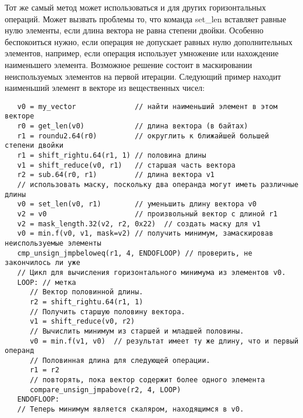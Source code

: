 \documentclass[forwardcom.tex]{subfiles}
\begin{document}
Тот же самый метод может использоваться и для других горизонтальных операций. Может вызвать проблемы то, что команда set\_len вставляет равные нулю элементы, если длина вектора не равна степени двойки. Особенно беспокоиться нужно, если операция не допускает равных нулю дополнительных элементов, например, если операция использует умножение или нахождение наименьшего элемента. Возможное решение состоит в маскировании неиспользуемых элементов на первой итерации. Следующий пример находит наименьший элемент в векторе из вещественных чисел:
\begin{verbatim}
   v0 = my_vector              // найти наименьший элемент в этом векторе
   r0 = get_len(v0)            // длина вектора (в байтах)
   r1 = roundu2.64(r0)         // округлить к ближайшей большей степени двойки
   r1 = shift_rightu.64(r1, 1) // половина длины
   v1 = shift_reduce(v0, r1)   // старшая часть вектора
   r2 = sub.64(r0, r1)         // длина вектора v1
   // использовать маску, поскольку два операнда могут иметь различные длины
   v0 = set_len(v0, r1)        // уменьшить длину вектора v0
   v2 = v0                     // произвольный вектор с длиной r1
   v2 = mask_length.32(v2, r2, 0x22)  // создать маску для v1
   v0 = min.f(v0, v1, mask=v2) // получить минимум, замаскировав неиспользуемые элементы
   cmp_unsign_jmpbeloweq(r1, 4, ENDOFLOOP) // проверить, не закончилось ли уже
   // Цикл для вычисления горизонтального минимума из элементов v0.
   LOOP: // метка
      // Вектор половинной длины.
      r2 = shift_rightu.64(r1, 1)
      // Получить старшую половину вектора.
      v1 = shift_reduce(v0, r2)
      // Вычислить минимум из старшей и младшей половины.
      v0 = min.f(v1, v0)  // результат имеет ту же длину, что и первый операнд
      // Половинная длина для следующей операции.
      r1 = r2
      // повторять, пока вектор содержит более одного элемента
      compare_unsign_jmpabove(r2, 4, LOOP)
   ENDOFLOOP:      
   // Теперь минимум является скаляром, находящимся в v0.
\end{verbatim}
\end{document}
